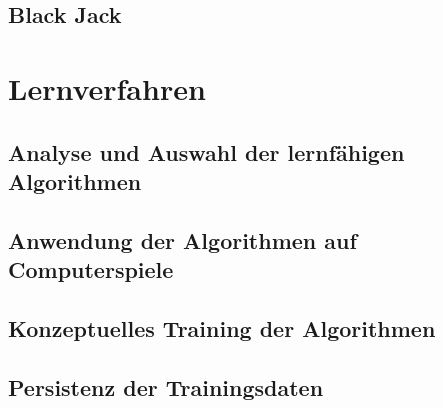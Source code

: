 \subsection{Black Jack}




\section{Lernverfahren}
\label{sec:lernverfahren}

\subsection{Analyse und Auswahl der lernfähigen Algorithmen}

\subsection{Anwendung der Algorithmen auf Computerspiele}

\subsection{Konzeptuelles Training der Algorithmen}

\subsection{Persistenz der Trainingsdaten}